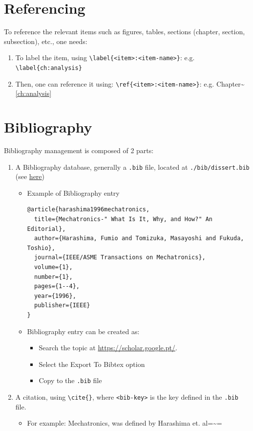 \documentclass[11pt]{article}
\begin{document}
\section{Referencing}
\label{sec:org4434181}
To reference the relevant items such as figures, tables, sections (chapter,
section, subsection), etc., one needs:
\begin{enumerate}
\item To label the item, using \texttt{\textbackslash{}label\{<item>:<item-name>\}}:
e.g. \texttt{\textbackslash{}label\{ch:analysis\}}
\item Then, one can reference it using: \texttt{\textbackslash{}ref\{<item>:<item-name>\}}:
e.g. Chapter\textasciitilde{}\ref{ch:analysis}
\end{enumerate}
\section{Bibliography}
\label{sec:orge62b455}
Bibliography management is composed of 2 parts:
\begin{enumerate}
\item A Bibliography database, generally a \texttt{.bib} file, located at
\texttt{./bib/dissert.bib} (see \href{file:///Users/zemiguel/Documents/Univ/MI\_Electro/Sem6/LPI2/PI/github/Deliverables/Final/bib/dissert.bib}{here})
\begin{itemize}
\item Example of Bibliography entry
\lstset{language=[LaTeX]TeX,label= ,caption= ,captionpos=b,numbers=none}
\begin{lstlisting}
@article{harashima1996mechatronics,
  title={Mechatronics-" What Is It, Why, and How?" An Editorial},
  author={Harashima, Fumio and Tomizuka, Masayoshi and Fukuda, Toshio},
  journal={IEEE/ASME Transactions on Mechatronics},
  volume={1},
  number={1},
  pages={1--4},
  year={1996},
  publisher={IEEE}
}
\end{lstlisting}
\item Bibliography entry can be created as:
\begin{itemize}
\item Search the topic at \url{https://scholar.google.pt/}.
\item Select the Export To Bibtex option
\item Copy to the \texttt{.bib} file
\end{itemize}
\end{itemize}
\item A citation, using \texttt{\textbackslash{}cite\{<bib-key>\}}, where \texttt{<bib-key>} is the key defined in
the \texttt{.bib} file. 
\begin{itemize}
\item For example: Mechatronics, was defined by Harashima
et. al=\textasciitilde{}\cite{harashima1996mechatronics}=
\end{itemize}
\end{enumerate}
\end{document}
